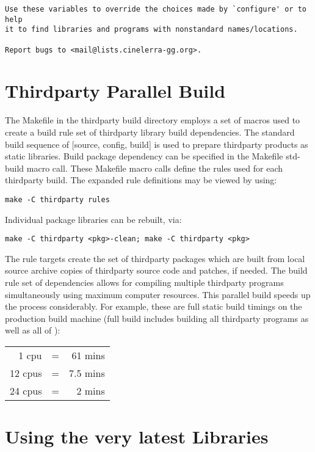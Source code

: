 \begin{verbatim}
Use these variables to override the choices made by `configure' or to help
it to find libraries and programs with nonstandard names/locations.

Report bugs to <mail@lists.cinelerra-gg.org>.

\end{verbatim}
\endgroup

\section{Thirdparty Parallel Build}
\label{sec:thirdparty_parallel_build}

The Makefile in the thirdparty build directory employs a set of macros used to create a build rule set of thirdparty library build dependencies.  The standard build sequence of [source, config, build] is used to prepare thirdparty products as static libraries.  Build package dependency can be specified in the Makefile std-build macro call.  These Makefile macro calls define the rules used for each thirdparty build.  The expanded rule definitions may be viewed by using:

\hspace{2em}\texttt{make -C thirdparty rules}

Individual package libraries can be rebuilt, via:

\hspace{2em}\texttt{make -C thirdparty <pkg>-clean;  make -C thirdparty <pkg>}

The rule targets create the set of thirdparty packages which are built from local source archive copies of thirdparty source code and patches, if needed.  The build rule set of dependencies allows for compiling multiple thirdparty programs simultaneously using maximum computer resources.  This parallel build speeds up the process considerably.  For example, these are full static build timings on the production build machine (full build includes building all thirdparty programs as well as all of \CGG{}):

\hspace{2em}
\begin{tabular}{@{}rcr}
	1 cpu & = & 61 mins\\
	12 cpus & = & 7.5 mins\\
	24 cpus & = & 2 mins\\
\end{tabular}

\section{Using the very latest Libraries}
\label{sec:latest_libraries}

